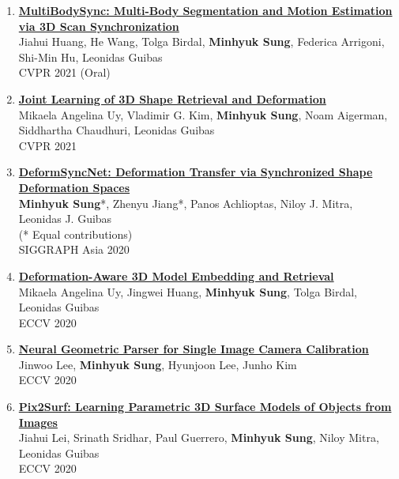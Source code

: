 \documentclass[letterpaper,10pt]{article} %
\newcommand{\blankline}{\quad\pagebreak[2]}
\begin{document}
\begin{enumerate}
\item \label{cvpr21_2}
\href{https://cg.cs.tsinghua.edu.cn/people/~huangjh/publication/multibodysync/}{\textbf{MultiBodySync: Multi-Body Segmentation and Motion Estimation via 3D Scan Synchronization}}\\
Jiahui Huang, He Wang, Tolga Birdal, \textbf{Minhyuk Sung}, Federica Arrigoni, Shi-Min Hu, Leonidas Guibas\\
CVPR 2021 (Oral)\\
\blankline

\item \label{cvpr21_1}
\href{https://joint-retrieval-deformation.github.io/}{\textbf{Joint Learning of 3D Shape Retrieval and Deformation}}\\
Mikaela Angelina Uy, Vladimir G. Kim, \textbf{Minhyuk Sung}, Noam Aigerman, Siddhartha Chaudhuri, Leonidas Guibas\\
CVPR 2021\\
\blankline

\item \label{siggraphasia20}
\href{https://mhsung.github.io/papers/deform-sync-net.html}{\textbf{DeformSyncNet: Deformation Transfer via Synchronized Shape Deformation Spaces}}\\
\textbf{Minhyuk Sung}*, Zhenyu Jiang*, Panos Achlioptas, Niloy J. Mitra, Leonidas J. Guibas\\
(* Equal contributions)\\
SIGGRAPH Asia 2020\\
\blankline

\item \label{eccv20_4}
\href{https://deformscan2cad.github.io/}{\textbf{Deformation-Aware 3D Model Embedding and Retrieval}}\\
Mikaela Angelina Uy, Jingwei Huang, \textbf{Minhyuk Sung}, Tolga Birdal, Leonidas Guibas\\
ECCV 2020\\
\blankline

\item \label{eccv20_3}
\href{https://arxiv.org/abs/2007.11855}{\textbf{Neural Geometric Parser for Single Image Camera Calibration}}\\
Jinwoo Lee, \textbf{Minhyuk Sung}, Hyunjoon Lee, Junho Kim\\
ECCV 2020\\
\blankline

\item \label{eccv20_2}
\href{https://geometry.stanford.edu/projects/pix2surf/}{\textbf{Pix2Surf: Learning Parametric 3D Surface Models of Objects from Images}}\\
Jiahui Lei, Srinath Sridhar, Paul Guerrero, \textbf{Minhyuk Sung}, Niloy Mitra, Leonidas Guibas\\
ECCV 2020\\
\blankline


\end{enumerate}
\end{document}
